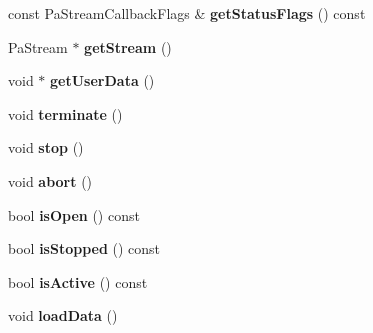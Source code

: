 \begin{DoxyCompactItemize}
\item 
\hypertarget{class_port_audio_wrap_a43a6d5f7562fde40166872b77a7804ea}{const Pa\-Stream\-Callback\-Flags \& {\bfseries get\-Status\-Flags} () const }\label{class_port_audio_wrap_a43a6d5f7562fde40166872b77a7804ea}

\item 
\hypertarget{class_port_audio_wrap_a33fed4f960c963aff711932ee84e9a1e}{Pa\-Stream $\ast$ {\bfseries get\-Stream} ()}\label{class_port_audio_wrap_a33fed4f960c963aff711932ee84e9a1e}

\item 
\hypertarget{class_port_audio_wrap_a07fdd881924d8b7b31b0ed309a8d56cb}{void $\ast$ {\bfseries get\-User\-Data} ()}\label{class_port_audio_wrap_a07fdd881924d8b7b31b0ed309a8d56cb}

\item 
\hypertarget{class_port_audio_wrap_a73b644da1b76cd3c6b1900218fcb4873}{void {\bfseries terminate} ()}\label{class_port_audio_wrap_a73b644da1b76cd3c6b1900218fcb4873}

\item 
\hypertarget{class_port_audio_wrap_a852668fd29440064746f2ce0530b3bc1}{void {\bfseries stop} ()}\label{class_port_audio_wrap_a852668fd29440064746f2ce0530b3bc1}

\item 
\hypertarget{class_port_audio_wrap_a22409ee2e9d87fbab60ef71288620c34}{void {\bfseries abort} ()}\label{class_port_audio_wrap_a22409ee2e9d87fbab60ef71288620c34}

\item 
\hypertarget{class_port_audio_wrap_ad4a72bbe2ec6190336c2412df076c3f7}{bool {\bfseries is\-Open} () const }\label{class_port_audio_wrap_ad4a72bbe2ec6190336c2412df076c3f7}

\item 
\hypertarget{class_port_audio_wrap_ae0bac2f93270a323c9ead4dbf61eda1d}{bool {\bfseries is\-Stopped} () const }\label{class_port_audio_wrap_ae0bac2f93270a323c9ead4dbf61eda1d}

\item 
\hypertarget{class_port_audio_wrap_ae89ba28aeb62269ae28be8908294bb1c}{bool {\bfseries is\-Active} () const }\label{class_port_audio_wrap_ae89ba28aeb62269ae28be8908294bb1c}

\item 
\hypertarget{class_port_audio_wrap_aa5776602a5e021fe3c83c1cdf36340d1}{void {\bfseries load\-Data} ()}\label{class_port_audio_wrap_aa5776602a5e021fe3c83c1cdf36340d1}

\end{DoxyCompactItemize}
